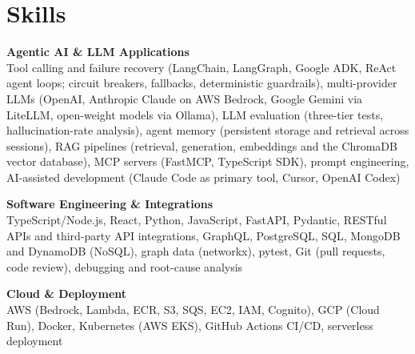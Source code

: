 \documentclass[a4paper,11pt]{article}
\newcommand{\skillgroup}[2]{{\color{headernavy}\textbf{#1}}\\ #2\par\vspace{3pt}}
\begin{document}
\section{Skills}
\skillgroup{Agentic AI \& LLM Applications}{Tool calling and failure recovery (LangChain, LangGraph, Google ADK, ReAct agent loops; circuit breakers, fallbacks, deterministic guardrails), multi-provider LLMs (OpenAI, Anthropic Claude on AWS Bedrock, Google Gemini via LiteLLM, open-weight models via Ollama), LLM evaluation (three-tier tests, hallucination-rate analysis), agent memory (persistent storage and retrieval across sessions), RAG pipelines (retrieval, generation, embeddings and the ChromaDB vector database), MCP servers (FastMCP, TypeScript SDK), prompt engineering, AI-assisted development (Claude Code as primary tool, Cursor, OpenAI Codex)}
\skillgroup{Software Engineering \& Integrations}{TypeScript/Node.js, React, Python, JavaScript, FastAPI, Pydantic, RESTful APIs and third-party API integrations, GraphQL, PostgreSQL, SQL, MongoDB and DynamoDB (NoSQL), graph data (networkx), pytest, Git (pull requests, code review), debugging and root-cause analysis}
\skillgroup{Cloud \& Deployment}{AWS (Bedrock, Lambda, ECR, S3, SQS, EC2, IAM, Cognito), GCP (Cloud Run), Docker, Kubernetes (AWS EKS), GitHub Actions CI/CD, serverless deployment}
\end{document}
